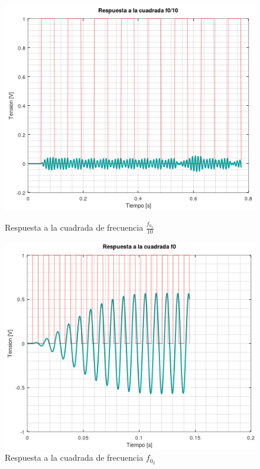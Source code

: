 \documentclass[11pt,a4paper]{report}
\begin{document}
\begin{figure}[t!]
\includegraphics[scale=0.95]{RtaCuadradaWo21.png}
\caption{Respuesta a la cuadrada de frecuencia $\frac{f_{0_{2}}}{10}$}
\includegraphics[scale=0.95]{RtaCuadradaWo22.png}
\caption{Respuesta a la cuadrada de frecuencia $f_{0_{2}}$}
\end{figure}
\clearpage
\end{document}
